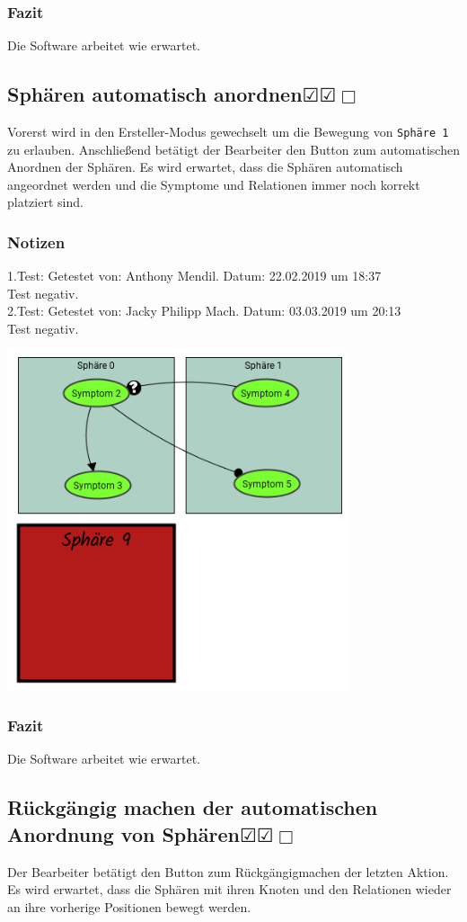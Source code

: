 \documentclass[enabledeprecatedfontcommands]{scrartcl}
\newcommand{\subsectiont}[2]{\subsection[#1]{#1{\normalsize\normalfont #2}}}
\newcommand{\leer}{$\Box$}
\newcommand{\ok}{$\CheckedBox$}
\begin{document}
\subsubsection{Fazit}
Die Software arbeitet wie erwartet.

\subsectiont{Sphären automatisch anordnen}{\dotfill\ok\ok\leer}
Vorerst wird in den Ersteller-Modus gewechselt um die Bewegung von \texttt{Sphäre 1} zu erlauben. Anschließend betätigt der Bearbeiter den Button zum automatischen Anordnen der Sphären. Es wird erwartet, dass die Sphären automatisch angeordnet werden und die Symptome und Relationen immer noch korrekt platziert sind.
\subsubsection{Notizen}
1.Test: Getestet von: Anthony Mendil. Datum: 22.02.2019 um 18:37 \\
Test negativ.\\
2.Test: Getestet von: Jacky Philipp Mach. Datum: 03.03.2019 um 20:13 \\
Test negativ. 
\begin{center}
\includegraphics[height=10cm]{2_17.PNG}
\end{center}
\subsubsection{Fazit}
Die Software arbeitet wie erwartet.

\subsectiont{Rückgängig machen der automatischen Anordnung von Sphären}{\dotfill\ok\ok\leer}
Der Bearbeiter betätigt den Button zum Rückgängigmachen der letzten Aktion. Es wird erwartet, dass die Sphären mit ihren Knoten und den Relationen wieder an ihre vorherige Positionen bewegt werden.
\end{document}

